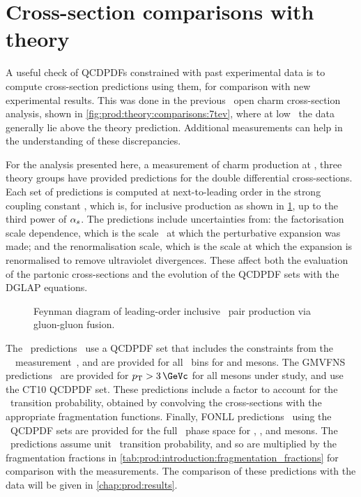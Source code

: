 \section{Cross-section comparisons with theory}
\label{chap:prod:theory:comparisons}

A useful check of \acp{QCDPDF} constrained with past experimental data is to 
compute cross-section predictions using them, for comparison with new 
experimental results.
This was done in the previous \lhcb\ open charm cross-section analysis, shown 
in \cref{fig:prod:theory:comparisons:7tev}, where at low \pT\ the data 
generally lie above the theory prediction.
Additional measurements can help in the understanding of these discrepancies.

For the analysis presented here, a measurement of charm production at 
, three theory groups have provided predictions for the double 
differential cross-sections.
Each set of predictions is computed at next-to-leading order in the strong 
coupling constant \alphas, which is, for inclusive production as shown in 
\cref{fig:prod:theory:qqbar_annihilation}, up to the third power of $\alpha_{s}$.
The predictions include uncertainties from: the factorisation scale dependence, 
which is the scale \pdfqsquared\ at which the perturbative expansion was made; 
and the renormalisation scale, which is the scale at which the expansion is 
renormalised to remove ultraviolet divergences.
These affect both the evaluation of the partonic cross-sections and the 
evolution of the \ac{QCDPDF} sets with the \ac{DGLAP} equations.

\begin{figure}
  \centering
  
  \caption{%
    Feynman diagram of leading-order inclusive \qqbar\ pair production via 
    gluon-gluon fusion.
  }
  \label{fig:prod:theory:qqbar_annihilation}
\end{figure}

The \nnpdfl\ predictions~\cite{Gauld:2015yia} use a \ac{QCDPDF} set that 
includes the constraints from the \ \lhcb\ 
measurement~\cite{LHCb-PAPER-2012-041}, and are provided for all \pTy\ bins for 
\PDz and \PDp mesons.
The \ac{GMVFNS} predictions~\cite{Kniehl:2012ti} are provided for $\pT > 
\SI{3}{\GeVc}$ for all mesons under study, and use the CT10 \ac{QCDPDF} set.
These predictions include a factor to account for the \cToHc\ transition 
probability, obtained by convolving the \decay{\ccbar}{\PHc} cross-sections 
with the appropriate fragmentation functions.
Finally, \ac{FONLL} predictions~\cite{Cacciari:2015fta} using the \nnpdf\ 
\ac{QCDPDF} sets are provided for the full \pTy\ phase space for \PDz, \PDp, 
and \PDstarp mesons.
The \fonll\ predictions assume unit \cToHc\ transition probability, and so are 
multiplied by the fragmentation fractions in 
\cref{tab:prod:introduction:fragmentation_fractions} for comparison with the 
measurements.
The comparison of these predictions with the data will be given in 
\cref{chap:prod:results}.

